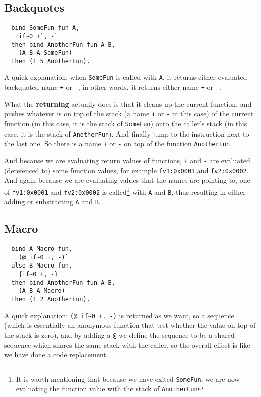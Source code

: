 \documentclass{book}
\begin{document}
\subsection{Backquotes}
\label{ssec:backquote}
\begin{verbatim}
  bind SomeFun fun A,
    if~0 +`, -`
  then bind AnotherFun fun A B,
    (A B A SomeFun)
  then (1 5 AnotherFun).
\end{verbatim}

A quick explanation: when \texttt{SomeFun} is called with \texttt{A}, it returns either evaluated backquoted name \texttt{+} or \texttt{-}, in other words, it returns either name \texttt{+} or \texttt{-}.

What the \textbf{returning} actually does is that it cleans up the current function, and pushes whatever is on top of the stack (a name \texttt{+} or \texttt{-} in this case) of the current function (in this case, it is the stack of \texttt{SomeFun}) onto the caller's stack (in this case, it is the stack of \texttt{AnotherFun}). And finally jump to the instruction next to the last one. So there is a name \texttt{+} or \texttt{-} on top of the function \texttt{AnotherFun}.

And because we are evaluating return values of functions, \texttt{+} and \texttt{-} are evaluated (derefenced to) some function values, for example \texttt{fv1:0x0001} and \texttt{fv2:0x0002}. And again because we are evaluating values that the names are pointing to, one of \texttt{fv1:0x0001} and \texttt{fv2:0x0002} is called\footnote{It is worth mentioning that because we have exited \texttt{SomeFun}, we are now evaluating the function value with the stack of \texttt{AnotherFun}} with \texttt{A} and \texttt{B}, thus resulting in either adding or substracting \texttt{A} and \texttt{B}.

\subsection{Macro}
\label{ssec:macro}
\begin{verbatim}
  bind A-Macro fun,
    (@ if~0 +, -)`
  also B-Macro fun,
    {if~0 +, -}
  then bind AnotherFun fun A B,
    (A B A-Macro)
  then (1 2 AnotherFun).
\end{verbatim}

A quick explanation: \texttt{(@ if\textasciitilde 0 +, -)} is returned as we want, so a sequence (which is essentially an anonymous function that test whether the value on top of the stack is zero), and by adding a \texttt{@} we define the sequence to be a shared sequence which shares the same stack with the caller, so the overall effect is like we have done a code replacement.
\end{document}
